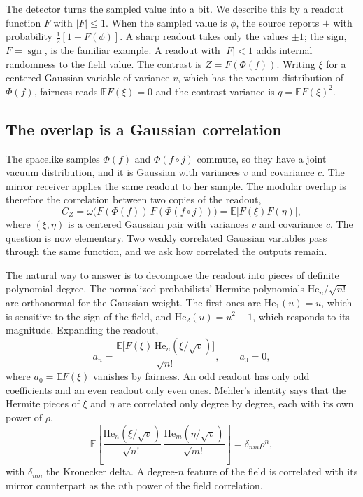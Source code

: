\documentclass[11pt,a4paper]{article}
\newcommand{\E}{\mathbb E}
\newcommand{\sgn}{\operatorname{sgn}}
\begin{document}
The detector turns the sampled value into a bit. We describe this by a readout function $F$ with $|F|\le1$. When the sampled value is $\phi$, the source reports $+$ with probability $\tfrac12[1+F(\phi)]$. A sharp readout takes only the values $\pm1$; the sign, $F=\sgn$, is the familiar example. A readout with $|F|<1$ adds internal randomness to the field value. The contrast is $Z=F(\Phi(f))$. Writing $\xi$ for a centered Gaussian variable of variance $v$, which has the vacuum distribution of $\Phi(f)$, fairness reads $\E F(\xi)=0$ and the contrast variance is $q=\E F(\xi)^2$.

\subsection{The overlap is a Gaussian correlation}

The spacelike samples $\Phi(f)$ and $\Phi(f\circ j)$ commute, so they have a joint vacuum distribution, and it is Gaussian with variances $v$ and covariance $c$. The mirror receiver applies the same readout to her sample. The modular overlap is therefore the correlation between two copies of the readout,
\begin{equation}
 C_Z=\omega\bigl(F(\Phi(f))\,F(\Phi(f\circ j))\bigr)=\E\bigl[F(\xi)F(\eta)\bigr],
 \label{eq:gaussian}
\end{equation}
where $(\xi,\eta)$ is a centered Gaussian pair with variances $v$ and covariance $c$. The question is now elementary. Two weakly correlated Gaussian variables pass through the same function, and we ask how correlated the outputs remain.

The natural way to answer is to decompose the readout into pieces of definite polynomial degree. The normalized probabilists' Hermite polynomials $\mathrm{He}_n/\sqrt{n!}$ are orthonormal for the Gaussian weight. The first ones are $\mathrm{He}_1(u)=u$, which is sensitive to the sign of the field, and $\mathrm{He}_2(u)=u^2-1$, which responds to its magnitude. Expanding the readout,
\begin{equation}
 a_n=\frac{\E\bigl[F(\xi)\,\mathrm{He}_n(\xi/\sqrt v)\bigr]}{\sqrt{n!}},\qquad a_0=0 ,
 \label{eq:hermite}
\end{equation}
where $a_0=\E F(\xi)$ vanishes by fairness. An odd readout has only odd coefficients and an even readout only even ones. Mehler's identity says that the Hermite pieces of $\xi$ and $\eta$ are correlated only degree by degree, each with its own power of $\rho$,
\begin{equation*}
 \E\left[\frac{\mathrm{He}_n(\xi/\sqrt v)}{\sqrt{n!}}\,
          \frac{\mathrm{He}_m(\eta/\sqrt v)}{\sqrt{m!}}\right]
 =\delta_{nm}\rho^n ,
\end{equation*}
with $\delta_{nm}$ the Kronecker delta. A degree-$n$ feature of the field is correlated with its mirror counterpart as the $n$th power of the field correlation.
\end{document}
